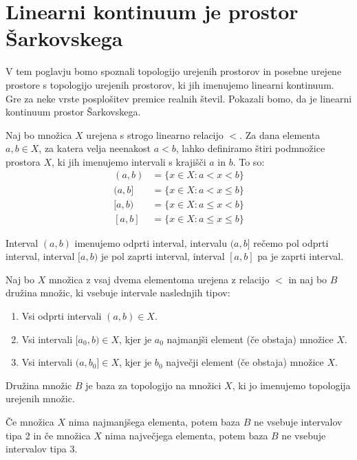 \documentclass[mat2]{fmfdelo}
\begin{document}
\section{Linearni kontinuum je prostor Šarkovskega}
V tem poglavju bomo spoznali topologijo urejenih prostorov in posebne urejene prostore s topologijo urejenih prostorov, ki jih imenujemo linearni kontinuum. Gre za neke vrste posplošitev premice realnih števil. Pokazali bomo, da je linearni kontinuum prostor Šarkovskega.

Naj bo množica $X$ urejena s strogo linearno relacijo $<$. Za dana elementa $a, b \in X$, za katera velja neenakost $a<b$, lahko definiramo štiri podmnožice prostora $X$, ki jih imenujemo intervali s krajišči $a$ in $b$. To so:
\begin{equation*} %
\begin{split}
(a, b) &= \{x \in X: a< x <b\} \\ 
(a, b] &= \{x \in X: a< x \leq b\} \\ 
[a, b) &= \{x \in X: a \leq x< b\} \\ 
[a, b] &= \{x \in X: a \leq x \leq b\}
\end{split}
\end{equation*}

\begin{opomba}\label{op:intervali}
Interval $(a, b)$ imenujemo odprti interval, intervalu $(a, b]$ rečemo pol odprti interval, interval $[a, b)$ je pol zaprti interval, interval $[a, b]$ pa je zaprti interval.
\end{opomba}

\begin{definicija}
Naj bo $X$ množica z vsaj dvema elementoma urejena z relacijo $<$ in naj bo $B$ družina množic, ki vsebuje intervale naslednjih tipov:
\begin{enumerate}
\item Vsi odprti intervali $(a, b) \in X$.
\item Vsi intervali $[a_0, b) \in X$, kjer je $a_0$ najmanjši element (če obstaja) množice $X$.
\item Vsi intervali $(a, b_0] \in X$, kjer je $b_0$ največji element (če obstaja) množice $X$.
\end{enumerate}
Družina množic $B$ je baza za topologijo na množici $X$, ki jo imenujemo topologija urejenih množic.
\end{definicija}

\begin{opomba}\label{op:ekstremi}
Če množica $X$ nima najmanjšega elementa, potem baza $B$ ne vsebuje intervalov tipa 2 in če množica $X$ nima največjega elementa, potem baza $B$ ne vsebuje intervalov tipa 3.
\end{opomba}
\end{document}
